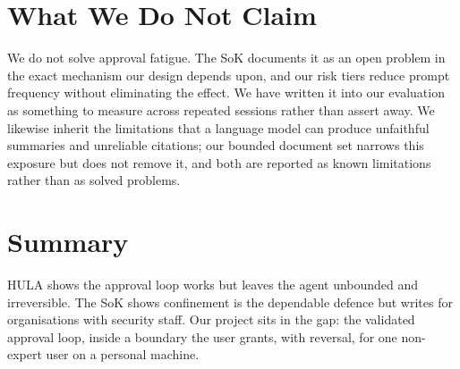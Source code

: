 \documentclass[11pt,a4paper]{article}
\begin{document}
\section{What We Do Not Claim}

We do not solve approval fatigue. The SoK documents it as an open problem in
the exact mechanism our design depends upon, and our risk tiers reduce prompt
frequency without eliminating the effect. We have written it into our
evaluation as something to measure across repeated sessions rather than assert
away. We likewise inherit the limitations that a language model can produce
unfaithful summaries and unreliable citations; our bounded document set narrows
this exposure but does not remove it, and both are reported as known
limitations rather than as solved problems.

\section{Summary}

HULA shows the approval loop works but leaves the agent unbounded and
irreversible. The SoK shows confinement is the dependable defence but writes for
organisations with security staff. Our project sits in the gap: the validated
approval loop, inside a boundary the user grants, with reversal, for one
non-expert user on a personal machine.
\end{document}
